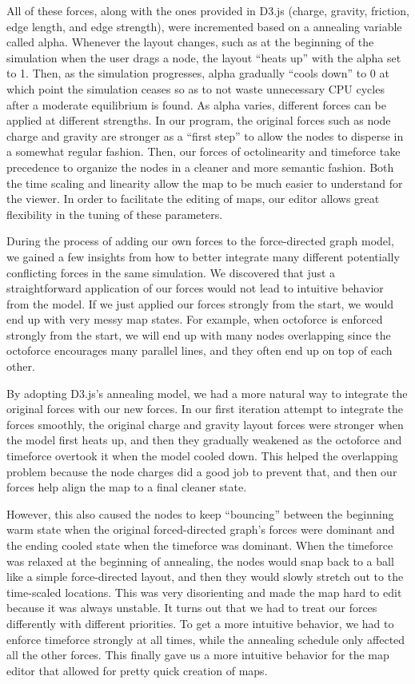\documentclass{chi2009}
\begin{document}
All of these forces, along with the ones provided in D3.js (charge, gravity, friction, edge length, and edge strength), were incremented based on a annealing variable called alpha.  Whenever the layout changes, such as at the beginning of the simulation when the user drags a node, the layout “heats up” with the alpha set to 1.  Then, as the simulation progresses, alpha gradually “cools down” to 0 at which point the simulation ceases so as to not waste unnecessary CPU cycles after a moderate equilibrium is found.  As alpha varies, different forces can be applied at different strengths.  In our program, the original forces such as node charge and gravity are stronger as a “first step” to allow the nodes to disperse in a somewhat regular fashion.  Then, our forces of octolinearity and timeforce take precedence to organize the nodes in a cleaner and more semantic fashion.  Both the time scaling and linearity allow the map to be much easier to understand for the viewer.  In order to facilitate the editing of maps, our editor allows great flexibility in the tuning of these parameters.  

During the process of adding our own forces to the force-directed graph model, we gained a few insights from how to better integrate many different potentially conflicting forces in the same simulation.  We discovered that just a straightforward application of our forces would not lead to intuitive behavior from the model.  If we just applied our forces strongly from the start, we would end up with very messy map states.  For example, when octoforce is enforced strongly from the start, we will end up with many nodes overlapping since the octoforce encourages many parallel lines, and they often end up on top of each other.  

By adopting D3.js’s annealing model, we had a more natural way to integrate the original forces with our new forces.  In our first iteration attempt to integrate the forces smoothly, the original charge and gravity layout forces were stronger when the model first heats up, and then they gradually weakened as the octoforce and timeforce overtook it when the model cooled down.  This helped the overlapping problem because the node charges did a good job to prevent that, and then our forces help align the map to a final cleaner state.  

However, this also caused the nodes to keep “bouncing” between the beginning warm state when the original forced-directed graph’s forces were dominant and the ending cooled state when the timeforce was dominant.  When the timeforce was relaxed at the beginning of annealing, the nodes would snap back to a ball like a simple force-directed layout, and then they would slowly stretch out to the time-scaled locations.  This was very disorienting and made the map hard to edit because it was always unstable.  
    It turns out that we had to treat our forces differently with different priorities.  To get a more intuitive behavior, we had to enforce timeforce strongly at all times, while the annealing schedule only affected all the other forces.  This finally gave us a more intuitive behavior for the map editor that allowed for pretty quick creation of maps.  
\end{document}
